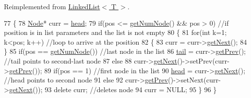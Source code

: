 Reimplemented from \hyperlink{classLinkedList_a62a89a30509d38b88c75177b8efa9a98}{Linked\+List$<$ T $>$}.


\begin{DoxyCode}
77 \{
78    \hyperlink{classNode}{Node}* curr = \hyperlink{classLinkedList_a35e09287e2d2943707b011208e7a8ed2}{head};
79    \textcolor{keywordflow}{if}(pos <= \hyperlink{classLinkedList_ae04dbbcae32f8fb03dce3e174854981f}{getNumNode}() && pos > 0) \textcolor{comment}{//if position is in list parameters and the list is not
       empty                                                                                                         }
80    \{
81       \textcolor{keywordflow}{for}(\textcolor{keywordtype}{int} k=1; k<pos; k++) \textcolor{comment}{//loop to arrive at the position                                            
                                                                                                       }
82       \{
83          curr = curr->\hyperlink{classNode_af8f2d178f274dd254e6e1965971f0fd0}{getNext}();
84       \}
85       \textcolor{keywordflow}{if}(pos == \hyperlink{classLinkedList_ae04dbbcae32f8fb03dce3e174854981f}{getNumNode}()) \textcolor{comment}{//last node in the list                                            
                                                                                                                 }
86          \hyperlink{classDoubleLinkedList_aa9a7bf7a1c989e7a49781ac62d49982c}{tail} = curr->\hyperlink{classNode_af4e96a27c770adc291f2f7a4bc2c538d}{getPrev}(); \textcolor{comment}{//tail points to second-last node                              
                                                                                                                  }
87       \textcolor{keywordflow}{else}
88          curr->\hyperlink{classNode_af8f2d178f274dd254e6e1965971f0fd0}{getNext}()->setPrev(curr->\hyperlink{classNode_af4e96a27c770adc291f2f7a4bc2c538d}{getPrev}());
89       \textcolor{keywordflow}{if}(pos == 1) \textcolor{comment}{//first node in the list}
90         \hyperlink{classLinkedList_a35e09287e2d2943707b011208e7a8ed2}{head} = curr->\hyperlink{classNode_af8f2d178f274dd254e6e1965971f0fd0}{getNext}(); \textcolor{comment}{//head points to second node                                    
                                                                                                                 }
91       \textcolor{keywordflow}{else}
92          curr->\hyperlink{classNode_af4e96a27c770adc291f2f7a4bc2c538d}{getPrev}()->setNext(curr->\hyperlink{classNode_af8f2d178f274dd254e6e1965971f0fd0}{getNext}());
93       \textcolor{keyword}{delete} curr; \textcolor{comment}{//deletes node                                                                          
                                                                                                       }
94       curr = NULL;
95    \}
96 \}
\end{DoxyCode}


